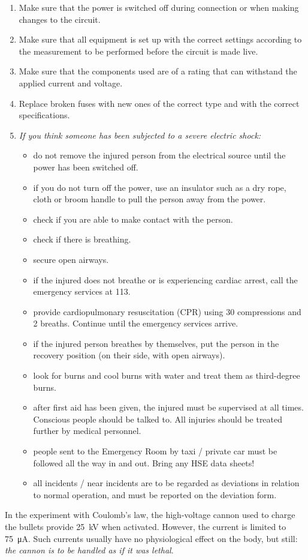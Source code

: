 \documentclass[../Elmag-labhefte-2020.tex]{subfiles}
\begin{document}
\begin{enumerate}
    \item Make sure that the power is switched off during connection or when making changes to the circuit.
    \item Make sure that all equipment is set up with the correct settings according to the measurement to be performed before the circuit is made live.
    \item Make sure that the components used are of a rating that can withstand the applied current and voltage.
    \item Replace broken fuses with new ones of the correct type and with the correct specifications.
    \item \emph{If you think someone has been subjected to a severe electric shock:}
    \begin{itemize}
        \item do not remove the injured person from the electrical source until the power has been switched off.
        \item if you do not turn off the power, use an insulator such as a dry rope, cloth or broom handle to pull the person away from the power.
        \item check if you are able to make contact with the person.
        \item check if there is breathing.
        \item secure open airways.
        \item if the injured does not breathe or is experiencing cardiac arrest, call the emergency services at 113.
        \item provide cardiopulmonary resuscitation (CPR) using 30 compressions and 2 breaths. Continue until the emergency services arrive.
        \item if the injured person breathes by themselves, put the person in the recovery position (on their side, with open airways).
        \item look for burns and cool burns with water and treat them as third-degree burns.
        \item after first aid has been given, the injured must be supervised at all times. Conscious people should be talked to. All injuries should be treated further by medical personnel.
        \item people sent to the Emergency Room by taxi / private car must be followed all the way in and out. Bring any HSE data sheets!
        \item all incidents / near incidents are to be regarded as deviations in relation to normal operation, and must be reported on the deviation form.
    \end{itemize}
\end{enumerate}

In the experiment with Coulomb's law, the high-voltage cannon used to charge the bullets provide \SI{25}{\kilo\V} when activated. However, the current is limited to \SI{75}{\micro\ampere}. Such currents usually have no physiological effect on the body, but still: \textit{the cannon is to be handled as if it was lethal}.
\end{document}
